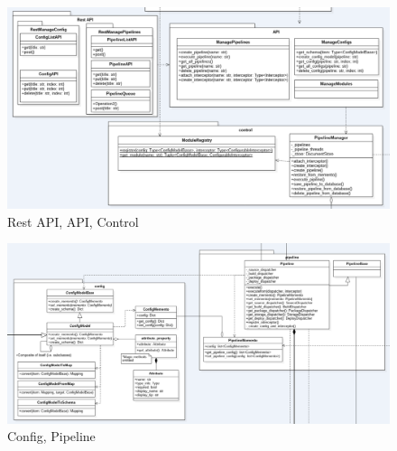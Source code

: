 	\begin{figure}[H]
		\includegraphics[width = 1.2\linewidth]{diagrams/api_control.png}
		\caption{Rest API, API, Control}
	\end{figure}

	\begin{figure}[H]
		\includegraphics[width = 1.2\linewidth]{diagrams/config_pipeline.png}
		\caption{Config, Pipeline}
	\end{figure}

